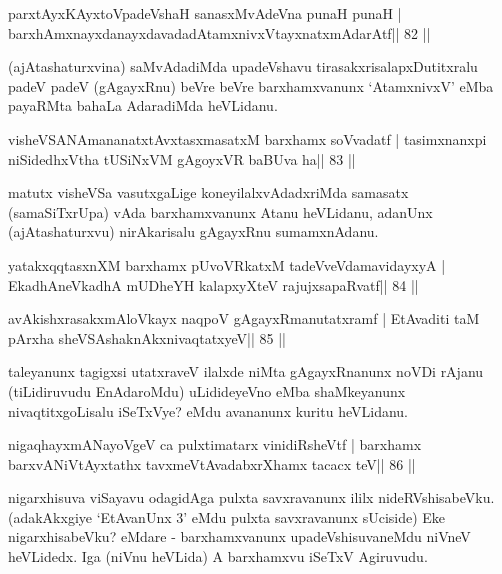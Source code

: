 \begin{shl}
parxtAyxKAyxtoVpadeVshaH sanasxMvAdeVna punaH punaH |
barxhAmxnayxdanayxdavadadAtamxnivxVtayxnatxmAdarAtf\hfill || 82 ||
\end{shl}

\begin{artha}
(ajAtashaturxvina) saMvAdadiMda upadeVshavu tirasakxrisalapxDutitxralu padeV padeV (gAgayxRnu) beVre beVre barxhamxvanunx `AtamxnivxV' eMba payaRMta bahaLa AdaradiMda heVLidanu.
\end{artha}

\begin{shl}
visheVSANAmananatxtAvxtasxmasatxM barxhamx soV\s vadatf |
tasimxnanxpi niSidedhxV\s tha tUSiNxVM gAgoyxVR baBUva ha\hfill || 83 ||
\end{shl}

\begin{artha}
matutx visheVSa vasutxgaLige koneyilalxvAdadxriMda samasatx  (samaSiTxrUpa) vAda barxhamxvanunx Atanu heVLidanu, adanUnx (ajAtashaturxvu) nirAkarisalu gAgayxRnu sumamxnAdanu.
\end{artha}

\begin{shl}
yatakxqqtasxnXM barxhamx pUvoVRkatxM tadeVveVdamavidayxyA |
EkadhA\s neVkadhA mUDheYH kalapxyXteV rajujxsapaRvatf\hfill || 84 ||
\end{shl}

\begin{shl}
avAkishxrasakxmAloVkayx naqpoV gAgayxRmanutatxramf |
EtAvaditi taM pArxha sheVSAshaknAkxnivaqtatxyeV\hfill || 85 ||
\end{shl}

\begin{artha}
taleyanunx tagigxsi utatxraveV ilalxde niMta gAgayxRnanunx noVDi rAjanu (tiLidiruvudu EnAdaroMdu) uLidideyeVno eMba shaMkeyanunx nivaqtitxgoLisalu iSeTxVye? eMdu avananunx kuritu heVLidanu.
\end{artha} 

\begin{shl}
nigaqhayxmANayoVgeV ca pulxtimatarx vinidiRsheVtf |
barxhamx barxvANiVtAyxtathx tavxmeVtAvadabxrXhamx tacacx teV\hfill || 86 ||
\end{shl}

\begin{artha}
nigarxhisuva viSayavu odagidAga pulxta savxravanunx ililx  nideRVshisabeVku. (adakAkxgiye `EtAvanUnx 3' eMdu pulxta savxravanunx  sUciside) Eke nigarxhisabeVku? eMdare - barxhamxvanunx upadeVshisuvaneMdu niVneV heVLidedx. Iga (niVnu heVLida) A barxhamxvu iSeTxV Agiruvudu.
\end{artha}


